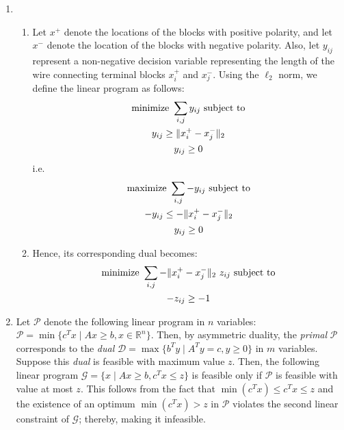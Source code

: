 \documentclass[10pt, letterpaper]{article}
\begin{document}

\begin{enumerate}[label={\bfseries Q\arabic*.}]
  \item
    \begin{enumerate}
      \item
        Let $x^+$ denote the locations of the blocks with positive polarity, and let $x^-$ denote the location of the blocks with
        negative polarity. Also, let $y_{ij}$ represent a non-negative decision variable representing the length of the wire
        connecting terminal blocks $x^+_i$ and $x^-_j$. Using the $\ell_2$ norm, we define the linear program as follows:
        \begin{gather*}
          \text{minimize}\ \displaystyle\sum_{i,j} y_{ij}\ \text{subject to} \\
          y_{ij} \geq \|x^+_i - x^-_j\|_2 \\
          y_{ij} \geq 0
        \end{gather*}
        i.e.
        \begin{gather*}
          \text{maximize}\ \displaystyle\sum_{i,j} -y_{ij}\ \text{subject to} \\
          -y_{ij} \leq -\|x^+_i - x^-_j\|_2 \\
          y_{ij} \geq 0
        \end{gather*}
      \item
        Hence, its corresponding dual becomes:
        \begin{gather*}
          \text{minimize}\ \dsum_{i,j} -\|x^+_i - x^-_j\|_2\ z_{ij} \ \text{subject to} \\
          -z_{ij} \geq -1
        \end{gather*}
    \end{enumerate}

  \item
    Let $\bm{\mathcal{P}}$ denote the following linear program in $n$ variables: $\bm{\mathcal{P}} = \min\{c^Tx \mid Ax \geq b, x \in
    \mathbb{R}^n\}$. Then, by asymmetric duality, the \textit{primal} $\bm{\mathcal{P}}$ corresponds to the \textit{dual} $\bm{\mathcal{D}} =
    \max\{b^Ty \mid A^Ty = c, y \geq 0\}$ in $m$ variables. Suppose this \textit{dual} is feasible with maximum value $z$.
    Then, the following linear program $\bm{\mathcal{G}} = \{x \mid Ax \geq b, c^Tx \leq z\}$ is feasible only if $\bm{\mathcal{P}}$ is
    feasible with value at most $z$. This follows from the fact that $\min(c^Tx) \leq c^Tx \leq z$ and the existence
    of an optimum $\min(c^Tx) > z$ in $\bm{\mathcal{P}}$ violates the second linear constraint of $\bm{\mathcal{G}}$; thereby, making it
    infeasible. \\


\end{enumerate}
\end{document}
